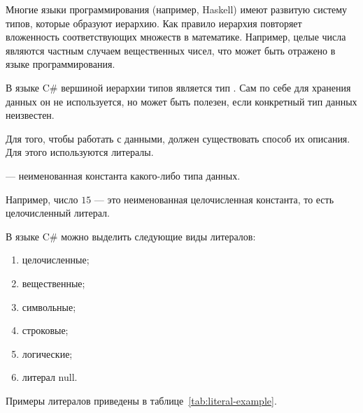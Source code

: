 Многие языки программирования (например, Haskell) имеют развитую
систему типов, которые образуют иерархию. Как правило иерархия
повторяет вложенность соответствующих множеств в математике. Например,
целые числа являются частным случаем вещественных чисел, что может
быть отражено в языке программирования.

В языке C\# вершиной иерархии типов является тип .  Сам
по себе для хранения данных он не используется, но может быть полезен,
если конкретный тип данных неизвестен.


Для того, чтобы работать с данными, должен существовать способ их
описания. Для этого используются литералы.

\begin{defn}
   — неименованная константа какого-либо типа
  данных.
\end{defn}

Например, число $15$ — это неименованная целочисленная константа, то
есть целочисленный литерал.

В языке C\# можно выделить следующие виды литералов:
\begin{enumerate}
\item целочисленные;
\item вещественные;
\item символьные;
\item строковые;
\item логические;
\item литерал null.
\end{enumerate}

Примеры литералов приведены в таблице~\ref{tab:literal-example}.

